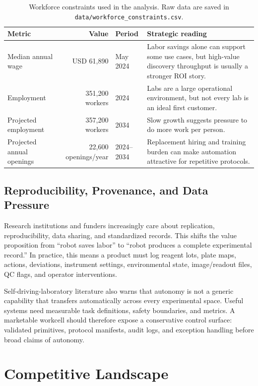 \documentclass[11pt]{article}
\begin{document}
\begin{table}[htbp]
\centering
\small
\begin{tabularx}{\linewidth}{@{}L{4.0cm}rL{2.0cm}Y@{}}
\toprule
\textbf{Metric} & \textbf{Value} & \textbf{Period} & \textbf{Strategic reading} \\
\midrule
Median annual wage & USD 61,890 & May 2024 & Labor savings alone can support some use cases, but high-value discovery throughput is usually a stronger ROI story. \\
Employment & 351,200 workers & 2024 & Labs are a large operational environment, but not every lab is an ideal first customer. \\
Projected employment & 357,200 workers & 2034 & Slow growth suggests pressure to do more work per person. \\
Projected annual openings & 22,600 openings/year & 2024--2034 & Replacement hiring and training burden can make automation attractive for repetitive protocols. \\
\bottomrule
\end{tabularx}
\caption{Workforce constraints used in the analysis. Raw data are saved in \texttt{data/workforce\_constraints.csv}.}
\label{tab:workforce}
\end{table}

\subsection{Reproducibility, Provenance, and Data Pressure}

Research institutions and funders increasingly care about replication, reproducibility, data sharing, and standardized records. This shifts the value proposition from ``robot saves labor'' to ``robot produces a complete experimental record.'' In practice, this means a product must log reagent lots, plate maps, actions, deviations, instrument settings, environmental state, image/readout files, QC flags, and operator interventions.

Self-driving-laboratory literature also warns that autonomy is not a generic capability that transfers automatically across every experimental space. Useful systems need measurable task definitions, safety boundaries, and metrics. A marketable workcell should therefore expose a conservative control surface: validated primitives, protocol manifests, audit logs, and exception handling before broad claims of autonomy.

\section{Competitive Landscape}
\end{document}
